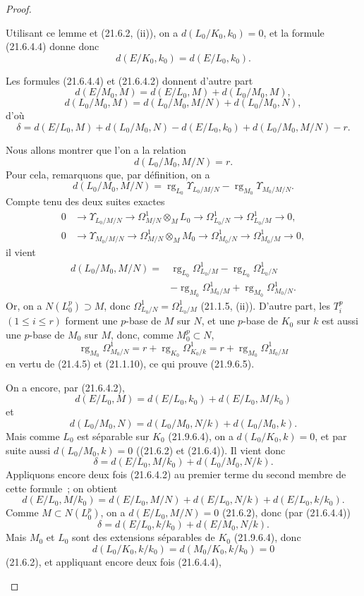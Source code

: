 \begin{proof}
\begin{enumerate}
  Utilisant ce lemme et (21.6.2, (ii)), on a $d(L_0/K_0,k_0)=0$, et la
  formule (21.6.4.4) donne donc
  \[
    d(E/K_0,k_0)=d(E/L_0,k_0).
  \]

  Les formules (21.6.4.4) et (21.6.4.2) donnent d'autre part
  \[
    d(E/M_0,M)=d(E/L_0,M)+d(L_0/M_0,M),
  \]
  \[
    d(L_0/M_0,M)=d(L_0/M_0,M/N)+d(L_0/M_0,N),
  \]
  d'où
  \[
    \delta=d(E/L_0,M)+d(L_0/M_0,N)-d(E/L_0,k_0)
    +d(L_0/M_0,M/N)-r.
  \]

  Nous allons montrer que l'on a la relation
  \begin{equation}
  \tag{21.9.6.5}
  \label{0.21.9.6.5-fr}
    d(L_0/M_0,M/N)=r.
  \end{equation}
  Pour cela, remarquons que, par définition, on a
  \[
    d(L_0/M_0,M/N)
    =\operatorname{rg}_{L_0}\Upsilon_{L_0/M/N}
    -\operatorname{rg}_{M_0}\Upsilon_{M_0/M/N}.
  \]
  Compte tenu des deux suites exactes
  \[
  \begin{aligned}
    0&\longrightarrow\Upsilon_{L_0/M/N}
      \longrightarrow\Omega^1_{M/N}\otimes_ML_0
      \longrightarrow\Omega^1_{L_0/N}
      \longrightarrow\Omega^1_{L_0/M}\longrightarrow0,\\
    0&\longrightarrow\Upsilon_{M_0/M/N}
      \longrightarrow\Omega^1_{M/N}\otimes_MM_0
      \longrightarrow\Omega^1_{M_0/N}
      \longrightarrow\Omega^1_{M_0/M}\longrightarrow0,
  \end{aligned}
  \]
  il vient
  \[
  \begin{split}
    d(L_0/M_0,M/N)={}&\operatorname{rg}_{L_0}\Omega^1_{L_0/M}
      -\operatorname{rg}_{L_0}\Omega^1_{L_0/N}\\
      &-\operatorname{rg}_{M_0}\Omega^1_{M_0/M}
      +\operatorname{rg}_{M_0}\Omega^1_{M_0/N}.
  \end{split}
  \]
  Or, on a $N(L_0^p)\supset M$, donc
  $\Omega^1_{L_0/N}=\Omega^1_{L_0/M}$ (21.1.5, (ii)). D'autre part, les
  $T_i^p$ $(1\leqslant i\leqslant r)$ forment une $p$-base de $M$ sur $N$,
  et une $p$-base de $K_0$ sur $k$ est aussi une $p$-base de $M_0$ sur $M$,
  donc, comme $M_0^p\subset N$,
  \[
    \operatorname{rg}_{M_0}\Omega^1_{M_0/N}
    =r+\operatorname{rg}_{K_0}\Omega^1_{K_0/k}
    =r+\operatorname{rg}_{M_0}\Omega^1_{M_0/M}
  \]
  en vertu de (21.4.5) et (21.1.10), ce qui prouve (21.9.6.5).

  On a encore, par (21.6.4.2),
  \[
    d(E/L_0,M)=d(E/L_0,k_0)+d(E/L_0,M/k_0)
  \]
  et
  \[
    d(L_0/M_0,N)=d(L_0/M_0,N/k)+d(L_0/M_0,k).
  \]
  Mais comme $L_0$ est séparable sur $K_0$ (21.9.6.4), on a
  $d(L_0/K_0,k)=0$, et par suite aussi $d(L_0/M_0,k)=0$ ((21.6.2) et
  (21.6.4)). Il vient donc
  \[
    \delta=d(E/L_0,M/k_0)+d(L_0/M_0,N/k).
  \]
  Appliquons encore deux fois (21.6.4.2) au premier terme du second membre de
  cette formule~; on obtient
  \[
    d(E/L_0,M/k_0)=d(E/L_0,M/N)+d(E/L_0,N/k)+d(E/L_0,k/k_0).
  \]
  Comme $M\subset N(L_0^p)$, on a $d(E/L_0,M/N)=0$ (21.6.2), donc (par
  (21.6.4.4))
  \[
    \delta=d(E/L_0,k/k_0)+d(E/M_0,N/k).
  \]
  Mais $M_0$ et $L_0$ sont des extensions séparables de $K_0$ (21.9.6.4),
  donc
  \[
    d(L_0/K_0,k/k_0)=d(M_0/K_0,k/k_0)=0
  \]
  (21.6.2), et appliquant encore deux fois (21.6.4.4),


\end{enumerate}
\end{proof}
